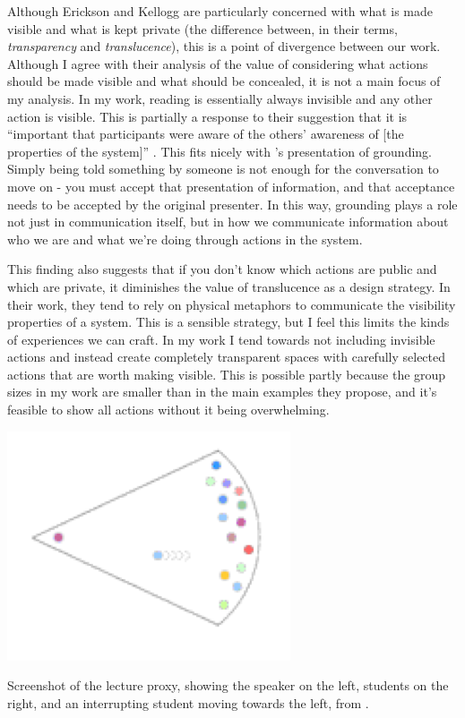 \documentclass{tufte-handout}
\begin{document}
Although Erickson and Kellogg are particularly concerned with what is made visible and what is kept private (the difference between, in their terms, \emph{transparency} and \emph{translucence}), this is a point of divergence between our work. Although I agree with their analysis of the value of considering what actions should be made visible and what should be concealed, it is not a main focus of my analysis. In my work, reading is essentially always invisible and any other action is visible. This is partially a response to their suggestion that it is ``important that participants were aware of the others' awareness of [the properties of the system]'' \citep{Erickson:2003td}. This fits nicely with \citet{Clark:1991wk}'s presentation of grounding. Simply being told something by someone is not enough for the conversation to move on - you must accept that presentation of information, and that acceptance needs to be accepted by the original presenter. In this way, grounding plays a role not just in communication itself, but in how we communicate information about who we are and what we're doing through actions in the system. 

This finding also suggests that if you don't know which actions are public and which are private, it diminishes the value of translucence as a design strategy. In their work, they tend to rely on physical metaphors to communicate the visibility properties of a system. This is a sensible strategy, but I feel this limits the kinds of experiences we can craft. In my work I tend towards not including invisible actions and instead create completely transparent spaces with carefully selected actions that are worth making visible. This is possible partly because the group sizes in my work are smaller than in the main examples they propose, and it's feasible to show all actions without it being overwhelming. 

\begin{marginfigure}
	\includegraphics{figures/lecture.png}
	\caption{Screenshot of the lecture proxy, showing the speaker on the left, students on the right, and an interrupting student moving towards the left, from \citep{Erickson:2003td}.}
	\label{fig:proxy-lecture}
\end{marginfigure}
\end{document}
